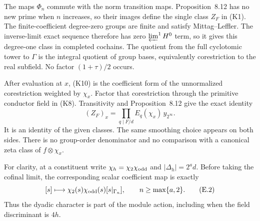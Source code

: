 The maps $\Phi_n$ commute with the norm transition maps.
Proposition~8.12 has no new prime when $n$ increases, so their
images define the single class $Z_F$ in (K1).
The finite-coefficient degree-zero groups are finite and satisfy
Mittag--Leffler. The inverse-limit exact sequence
\cite[Corollary 4.1.3, p.~96]{nekovar} therefore has zero
$\varprojlim^1 H^0$ term, so it gives this degree-one class
in completed cochains.
The quotient from the full cyclotomic tower to $\Gamma$ is the
integral quotient of group bases, equivalently corestriction to
the real subfield. No factor $(1+\tau)/2$ occurs.

After evaluation at $x$, (K10) is the coefficient form of the
unnormalized corestriction weighted by $\chi_x$. Factor that
corestriction through the primitive conductor field in (K8).
Transitivity and Proposition~8.12 give the exact identity
\[
              (Z_F)_x=
       \prod_{q\mid F/d}E_q(\chi_x)\,y_{2^\infty}.        \tag{E.1}
\]
It is an identity of the given classes. The same smoothing choice
appears on both sides. There is no group-order denominator and no
comparison with a canonical zeta class of $f\otimes\chi_x$.

For clarity, at a constituent write $\chi_h=\chi_2\chi_{\rm odd}$ and
$|\Delta_h|=2^a d$. Before taking the cofinal limit, the corresponding
scalar coefficient map is exactly
\[
 [s]\longmapsto\chi_2(s)\chi_{\rm odd}(s)[s|_{\Gamma_n}],
                    \qquad n\ge\max\{a,2\}.\tag{E.2}
\]
Thus the dyadic character is part of the module action, including
when the field discriminant is $4h$.


